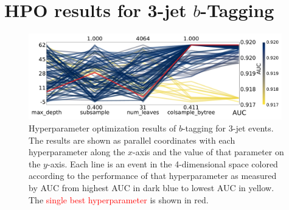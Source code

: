 \FloatBarrier
\section[HPO results for 3-jet b-Tagging]{HPO results for 3-jet $b$-Tagging}
\begin{figure}
  \includegraphics[width=0.98\textwidth, trim=0 0 0 0, clip]{figures/quarks/CV_viz-njet=3-name=lf_lgb_down_sample=1.00-ML_vars=vertex-selection=b-ejet_min=4-n_iter_RS_lgb=99-n_iter_RS_xgb=9-cdot_cut=0.90-version=19.pdf}
  \caption[Parallel Coordinate Plot of HPO results for 3-Jet $b$-Tagging]
          {Hyperparameter optimization results of $b$-tagging for 3-jet events. The results are shown as parallel coordinates with each hyperparameter along the $x$-axis and the value of that parameter on the $y$-axis. Each line is an event in the 4-dimensional space colored according to the performance of that hyperparameter as measured by AUC from \textcolor{viridis-dark}{highest} AUC in dark blue to \textcolor{viridis-light}{lowest} AUC in yellow. The \textcolor{red}{single best hyperparameter} is shown in red. 
          } 
  \label{fig:q:initial_CV_res_parallel_coords_3j}
\end{figure}
\vspace{4cm}
